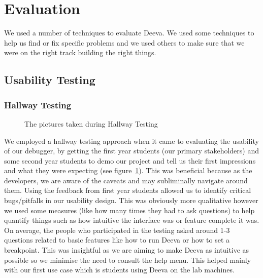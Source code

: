 \documentclass[11pt, a4paper]{article}
\begin{document}
\section{Evaluation}
\label{sec:evaluation}
We used a number of techniques to evaluate Deeva.
We used some techniques to help us find or fix specific problems and we used others to make sure that we were on the right track building the right things.
\subsection{Usability Testing}

\subsubsection{Hallway Testing}
\begin{figure}[h!]
\centering
{}
\quad
{}
\caption{The pictures taken during Hallway Testing}
\label{fig:hallway}
\end{figure}

We employed a hallway testing approach when it came to evaluating the usability of our debugger, by getting the first year students (our primary stakeholders) and some second year students to demo our project and tell us their first impressions and what they were expecting (see figure~\ref{fig:hallway}). This was beneficial because as the developers, we are aware of the caveats and may subliminally navigate around them.
Using the feedback from first year students allowed us to identify critical bugs/pitfalls in our usability design.
This was obviously more qualitative however we used some measures (like how many times they had to ask questions) to help quantify things such as how intuitive the interface was or feature complete it was.
On average, the people who participated in the testing asked around 1-3 questions related to basic features like how to run Deeva or how to set a breakpoint.
This was insightful as we are aiming to make Deeva as intuitive as possible so we minimise the need to consult the help menu.
This helped mainly with our first use case which is students using Deeva on the lab machines.
\end{document}
